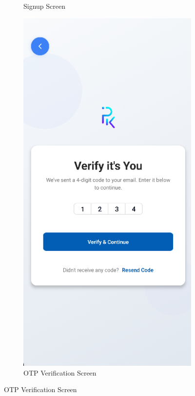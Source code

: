 \begin{figure}[htbp]
\begin{subfigure}[b]{0.3\textwidth}
        \caption{Signup Screen}
        \label{fig:mobile-signup}
    \end{subfigure}
    \hfill
    \begin{subfigure}[b]{0.3\textwidth}
        \centering
        \includegraphics[width=\textwidth]{images/mobile-auth-screen_otp.png}
        \caption{OTP Verification Screen}
        \label{fig:mobile-otp}
    \end{subfigure}
    

\end{figure}
